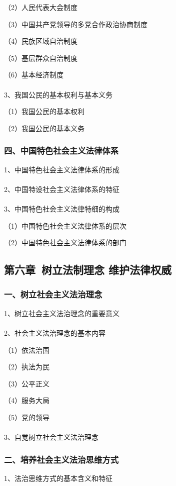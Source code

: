 \documentclass{ctexart}
\begin{document}
（2）人民代表大会制度

（3）中国共产党领导的多党合作政治协商制度

（4）民族区域自治制度

（5）基层群众自治制度

（6）基本经济制度
\\\\

3、我国公民的基本权利与基本义务

（1）我国公民的基本权利

（2）我国公民的基本义务

\subsubsection{四、中国特色社会主义法律体系}
1、中国特色社会主义法律体系的形成
\\\\

2、中国特设社会主义法律体系的特征
\\\\

3、中国特色社会主义法律特细的构成

（1）中国特色社会主义法律体系的层次

（2）中国特色社会主义法律体系的部门


\subsection{第六章\ 树立法制理念 维护法律权威}
\subsubsection{一、树立社会主义法治理念}

1、树立社会主义法治理念的重要意义
\\\\

2、社会主义法治理念的基本内容

（1）依法治国

（2）执法为民

（3）公平正义

（4）服务大局

（5）党的领导
\\\\

3、自觉树立社会主义法治理念


\subsubsection{二、培养社会主义法治思维方式}
1、法治思维方式的基本含义和特征
\\\\
\end{document}
